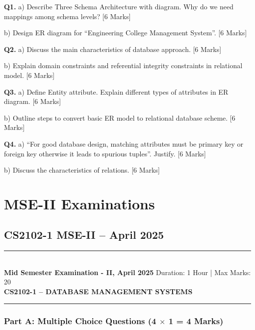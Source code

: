 \documentclass[11pt,a4paper]{article}
\newcommand{\examheader}[4]{
\noindent\rule{\textwidth}{0.5pt}\\
\textbf{#1} \hfill Duration: #3 | Max Marks: #4\\
\textbf{#2}\\
\rule{\textwidth}{0.5pt}
\vspace{0.2cm}
}
\begin{document}
\textbf{Q1.} a) Describe Three Schema Architecture with diagram. Why do we need mappings among schema levels? \hfill [6 Marks]

b) Design ER diagram for ``Engineering College Management System''. \hfill [6 Marks]

\textbf{Q2.} a) Discuss the main characteristics of database approach. \hfill [6 Marks]

b) Explain domain constraints and referential integrity constraints in relational model. \hfill [6 Marks]

\textbf{Q3.} a) Define Entity attribute. Explain different types of attributes in ER diagram. \hfill [6 Marks]

b) Outline steps to convert basic ER model to relational database scheme. \hfill [6 Marks]

\textbf{Q4.} a) ``For good database design, matching attributes must be primary key or foreign key otherwise it leads to spurious tuples''. Justify. \hfill [6 Marks]

b) Discuss the characteristics of relations. \hfill [6 Marks]

\section{MSE-II Examinations}

\subsection{CS2102-1 MSE-II -- April 2025}
\examheader{Mid Semester Examination - II, April 2025}{CS2102-1 -- DATABASE MANAGEMENT SYSTEMS}{1 Hour}{20}

\subsubsection*{Part A: Multiple Choice Questions (4 $\times$ 1 = 4 Marks)}
\end{document}
